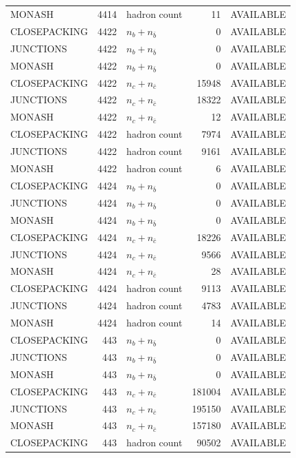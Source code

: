 \begin{landscape}
\begin{longtable}{@{}lrlrl@{}}
MONASH & 4414 & hadron count & \num{11} & AVAILABLE \\
CLOSEPACKING & 4422 & $n_b+n_{\bar b}$ & \num{0} & AVAILABLE \\
JUNCTIONS & 4422 & $n_b+n_{\bar b}$ & \num{0} & AVAILABLE \\
MONASH & 4422 & $n_b+n_{\bar b}$ & \num{0} & AVAILABLE \\
CLOSEPACKING & 4422 & $n_c+n_{\bar c}$ & \num{15948} & AVAILABLE \\
JUNCTIONS & 4422 & $n_c+n_{\bar c}$ & \num{18322} & AVAILABLE \\
MONASH & 4422 & $n_c+n_{\bar c}$ & \num{12} & AVAILABLE \\
CLOSEPACKING & 4422 & hadron count & \num{7974} & AVAILABLE \\
JUNCTIONS & 4422 & hadron count & \num{9161} & AVAILABLE \\
MONASH & 4422 & hadron count & \num{6} & AVAILABLE \\
CLOSEPACKING & 4424 & $n_b+n_{\bar b}$ & \num{0} & AVAILABLE \\
JUNCTIONS & 4424 & $n_b+n_{\bar b}$ & \num{0} & AVAILABLE \\
MONASH & 4424 & $n_b+n_{\bar b}$ & \num{0} & AVAILABLE \\
CLOSEPACKING & 4424 & $n_c+n_{\bar c}$ & \num{18226} & AVAILABLE \\
JUNCTIONS & 4424 & $n_c+n_{\bar c}$ & \num{9566} & AVAILABLE \\
MONASH & 4424 & $n_c+n_{\bar c}$ & \num{28} & AVAILABLE \\
CLOSEPACKING & 4424 & hadron count & \num{9113} & AVAILABLE \\
JUNCTIONS & 4424 & hadron count & \num{4783} & AVAILABLE \\
MONASH & 4424 & hadron count & \num{14} & AVAILABLE \\
CLOSEPACKING & 443 & $n_b+n_{\bar b}$ & \num{0} & AVAILABLE \\
JUNCTIONS & 443 & $n_b+n_{\bar b}$ & \num{0} & AVAILABLE \\
MONASH & 443 & $n_b+n_{\bar b}$ & \num{0} & AVAILABLE \\
CLOSEPACKING & 443 & $n_c+n_{\bar c}$ & \num{181004} & AVAILABLE \\
JUNCTIONS & 443 & $n_c+n_{\bar c}$ & \num{195150} & AVAILABLE \\
MONASH & 443 & $n_c+n_{\bar c}$ & \num{157180} & AVAILABLE \\
CLOSEPACKING & 443 & hadron count & \num{90502} & AVAILABLE \\

\end{longtable}
\end{landscape}
